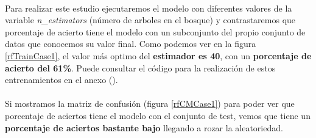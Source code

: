 \paragraph{}
Para realizar este estudio ejecutaremos el modelo con diferentes valores de la variable \textit{n\_estimators}\cite{ref:rf_random_forest_classifier} (número de arboles en el bosque) y contrastaremos que porcentaje de acierto tiene el modelo con un subconjunto del propio conjunto de datos que conocemos su valor final. Como podemos ver en la figura \ref{rfTrainCase1}, el valor más optimo del \textbf{estimador es 40}, con un \textbf{porcentaje de acierto del 61\%}. Puede consultar el código para la realización de estos entrenamientos en el anexo ().

\paragraph{}
Si mostramos la matriz de confusión\cite{ref:confusion_matrix} (figura \ref{rfCMCase1}) para poder ver que porcentaje de aciertos tiene el modelo con el conjunto de test, vemos que tiene un \textbf{porcentaje de aciertos bastante bajo} llegando a rozar la aleatoriedad.

